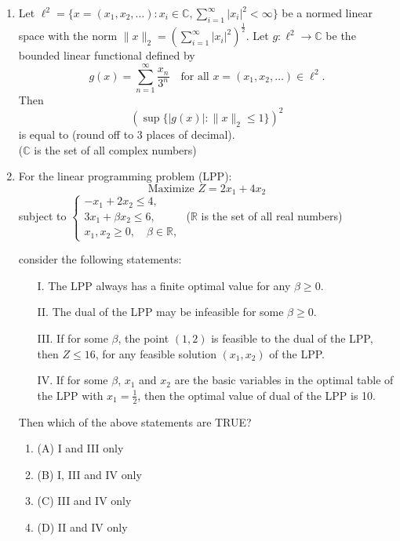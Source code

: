 \documentclass[journal]{IEEEtran}
\numberwithin{equation}{enumi}
\numberwithin{figure}{enumi}
\begin{document}
\begin{enumerate}
\item Let
$
\ell^2 = \{ x = (x_1, x_2, \ldots) : x_i \in \mathbb{C}, \sum_{i=1}^{\infty} |x_i|^2 < \infty \}
$
be a normed linear space with the norm
$
\| x \|_2 = \left( \sum_{i=1}^{\infty} |x_i|^2 \right)^{\frac{1}{2}}.
$
Let $g : \ell^2 \to \mathbb{C}$ be the bounded linear functional defined by
\[
g(x) = \sum_{n=1}^{\infty} \frac{x_n}{3^n} \quad \text{for all } x = (x_1, x_2, \dots) \in \ell^2.
\]
Then
\[
\left( \sup \{ |g(x)| : \| x \|_2 \leq 1 \} \right)^2
\]
is equal to \underline{\hspace{1cm}} (round off to 3 places of decimal). \\
($\mathbb{C}$ is the set of all complex numbers)
\bigskip

\item For the linear programming problem (LPP):
\[
\text{Maximize } Z = 2x_1 + 4x_2
\]
subject to
$
\begin{cases}
-x_1 + 2x_2 \leq 4, \\
3x_1 + \beta x_2 \leq 6, \\
x_1, x_2 \geq 0, \quad \beta \in \mathbb{R},
\end{cases}
$
($\mathbb{R}$ is the set of all real numbers)

consider the following statements:
\begin{enumerate}
    \item[I.] The LPP always has a finite optimal value for any $\beta \geq 0$.
    \item[II.] The dual of the LPP may be infeasible for some $\beta \geq 0$.
    \item[III.] If for some $\beta$, the point $(1,2)$ is feasible to the dual of the LPP, then $Z \leq 16$, for any feasible solution $(x_1, x_2)$ of the LPP.
    \item[IV.] If for some $\beta$, $x_1$ and $x_2$ are the basic variables in the optimal table of the LPP with $x_1 = \frac{1}{2}$, then the optimal value of dual of the LPP is 10.
\end{enumerate}

Then which of the above statements are TRUE?

\begin{enumerate}
    \item (A) I and III only
    \item (B) I, III and IV only
    \item (C) III and IV only
    \item (D) II and IV only
\end{enumerate}
\bigskip

\end{enumerate}
\end{document}
